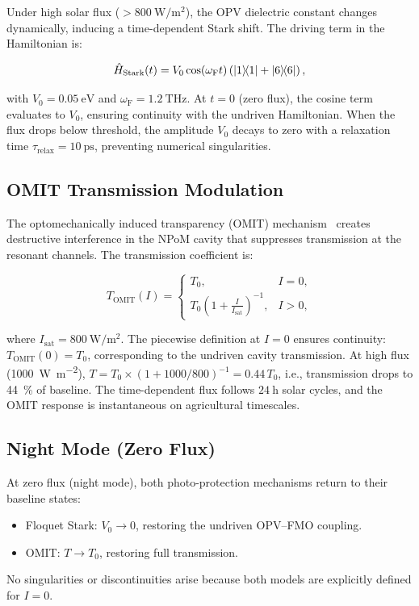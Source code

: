 \documentclass[11pt,a4paper]{article}
\begin{document}
Under high solar flux ($> \SI{800}{\W\per\m\squared}$), the OPV dielectric constant changes dynamically, inducing a time-dependent Stark shift.
The driving term in the Hamiltonian is:

\begin{equation}
\hat{H}_{\mathrm{Stark}}(t) = V_0 \cos(\omega_{\mathrm{F}} t) \left( \dyad{1}{1} + \dyad{6}{6} \right),
\label{eq:SI_stark_detuning}
\end{equation}

with $V_0 = \SI{0.05}{\eV}$ and $\omega_{\mathrm{F}} = \SI{1.2}{\THz}$.
At $t = 0$ (zero flux), the cosine term evaluates to $V_0$, ensuring continuity with the undriven Hamiltonian.
When the flux drops below threshold, the amplitude $V_0$ decays to zero with a relaxation time $\tau_{\mathrm{relax}} = \SI{10}{\ps}$, preventing numerical singularities.

\subsection{OMIT Transmission Modulation}

The optomechanically induced transparency (OMIT) mechanism~\cite{Aspelmeyer2014} creates destructive interference in the NPoM cavity that suppresses transmission at the resonant channels.
The transmission coefficient is:

\begin{equation}
T_{\mathrm{OMIT}}(I) = 
\begin{cases}
T_0, & I = 0, \\
T_0 \left(1 + \frac{I}{I_{\mathrm{sat}}}\right)^{-1}, & I > 0,
\end{cases}
\label{eq:SI_omit}
\end{equation}

where $I_{\mathrm{sat}} = \SI{800}{\W\per\m\squared}$.
The piecewise definition at $I=0$ ensures continuity: $T_{\mathrm{OMIT}}(0) = T_0$, corresponding to the undriven cavity transmission.
At high flux (\SI{1000}{\W\per\m\squared}), $T = T_0 \times (1 + 1000/800)^{-1} = 0.44\,T_0$, i.e., transmission drops to \SI{44}{\percent} of baseline.
The time-dependent flux follows $\SI{24}{\hour}$ solar cycles, and the OMIT response is instantaneous on agricultural timescales.

\subsection{Night Mode (Zero Flux)}

At zero flux (night mode), both photo-protection mechanisms return to their baseline states:
\begin{itemize}
\item Floquet Stark: $V_0 \to 0$, restoring the undriven OPV--FMO coupling.
\item OMIT: $T \to T_0$, restoring full transmission.
\end{itemize}
No singularities or discontinuities arise because both models are explicitly defined for $I=0$.
\end{document}
